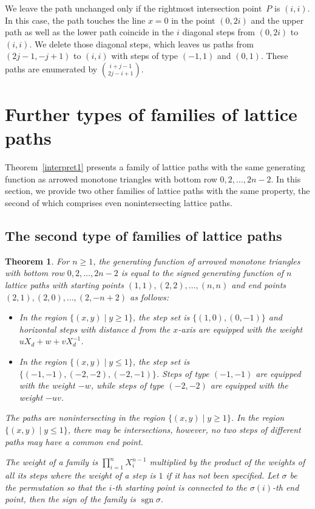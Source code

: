 \documentclass[12pt]{amsart}
\newtheorem{theorem}{Theorem}[section]
\theoremstyle{definition}
\numberwithin{equation}{section}
\DeclareMathOperator{\sgn}{sgn}
\begin{document}
We leave the path unchanged only if the rightmost intersection point~$P$ is $(i,i)$. In this case, the path touches the line $x=0$ in the point $(0,2i)$ and the upper path as well as the lower path coincide in the $i$ diagonal steps from $(0,2i)$ to $(i,i)$. We delete those diagonal steps, which leaves us paths from $(2j-1,-j+1)$ to $(i,i)$ with steps of type $(-1,1)$ and $(0,1)$. These paths are enumerated by $\binom{i+j-1}{2j-i+1}$.

\section{Further types of families of lattice paths}
\label{sec:further_lattice_paths}
Theorem~\ref{interpret1} presents a family of lattice paths with the same generating function as arrowed monotone triangles with bottom row $0,2,\ldots,2n-2$. In this section, we provide two other families of lattice paths with the same property, the second of which comprises even nonintersecting lattice paths.

\subsection{The second type of families of lattice paths} 

\begin{theorem} 
	\label{interpret2} 
	For $n \ge 1$, the generating function of arrowed monotone triangles with bottom row 
	$0,2,\ldots,2n-2$ is equal to the signed generating function of $n$ lattice paths with starting points
	$(1,1),(2,2),\ldots,(n,n)$ and end points $(2,1),(2,0),\ldots,(2,-n+2)$ as follows:
	\begin{itemize} 
		\item In the region $\{(x,y) \mid y \ge 1\}$, the step set is $\{(1,0),(0,-1)\}$ and horizontal steps with distance $d$ from the $x$-axis are equipped with the weight $u X_d + w + v X_d^{-1}$. 
		\item In the region $\{(x,y) \mid y \le 1\}$, the step set is $\{(-1,-1),(-2,-2),(-2,-1)\}$. Steps of type $(-1,-1)$ are equipped with the weight $-w$, while steps of type $(-2,-2)$ are equipped with the weight $-u v$.  
	\end{itemize} 
	The paths are nonintersecting in the region $\{(x,y) \mid y \ge 1\}$. In the region $\{(x,y) \mid y \le 1\}$, there may be intersections, however, no two steps of different paths may have a common end point. 
	
	The weight of a family is $\prod_{i=1}^{n} X_i^{n-1}$ multiplied by the product of the weights of all its steps where the weight of a step is $1$ if it has not been specified. 
	Let $\sigma$ be the permutation so that the $i$-th starting point is connected to the $\sigma(i)$-th end point, then the sign of the family is $\sgn \sigma$.
\end{theorem}
\end{document}
